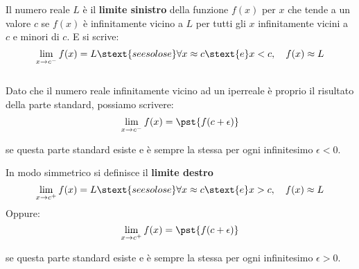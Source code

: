 \begin{definizione}
Il numero reale \(L\) è il \textbf{limite sinistro} della funzione \(f(x)\) 
per \(x\) che tende a un valore \(c\) se \(f(x)\) è infinitamente vicino a 
\(L\) per tutti gli \(x\) infinitamente vicini a \(c\) e minori di 
\(c\). \quad 
E si scrive:
\[\lim_{x \to c^-} f(x) = L \stext{ se e solo se } 
\forall x \approx c \stext{ e } x < c, \quad f(x) \approx L\] \\
Dato che il numero reale infinitamente vicino ad un iperreale è proprio il 
risultato della parte standard, possiamo scrivere:
\[\lim_{x \to c^-} f(x) = \pst{f(c + \epsilon)} \]

\vspace{-1.5em}
\begin{center} 
se questa parte standard esiste e è sempre la stessa 
per ogni infinitesimo \(\epsilon < 0\).
\end{center}
\end{definizione}

\begin{definizione}
In modo simmetrico si definisce il \textbf{limite destro}
\[\lim_{x \to c^+} f(x) = L \stext{ se e solo se } 
\forall x \approx c \stext{ e } x > c, \quad f(x) \approx L\] 
Oppure:
\[\lim_{x \to c^+} f(x) = \pst{f(c + \epsilon)} \]

\vspace{-1.5em}
\begin{center} 
se questa parte standard esiste e è sempre la stessa 
per ogni infinitesimo \(\epsilon > 0\).
\end{center}
\end{definizione}

